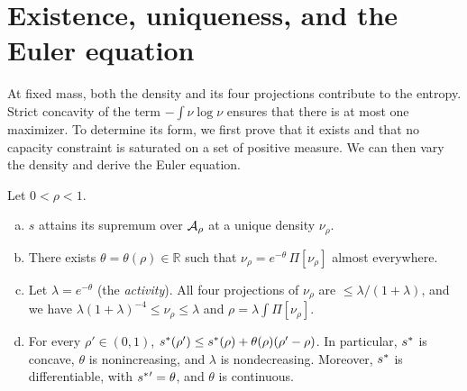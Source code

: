 \section{Existence, uniqueness, and the Euler equation}\label{sec:euler}

At fixed mass, both the density and its four projections contribute to the entropy. Strict concavity of the term $-\int\nu\log\nu$
ensures that there is at most one maximizer. To determine its form, we first prove that it exists and that no capacity constraint is
saturated on a set of positive measure. We can then vary the density and derive the Euler equation.

\begin{teorema}\label{thm:max} Let $0<\rho<1$. \begin{enumerate}[(a)] \item $s$ attains its supremum over ${\mathcal{A}}_\rho$ at a unique
density $\nu_\rho$. \item There exists $\theta=\theta(\rho)\in\mathbb R$ such that $\nu_\rho=e^{-\theta}\,\Pi[\nu_\rho]$ almost
everywhere. \item Let $\lambda=e^{-\theta}$ (the \emph{activity}). All four projections of $\nu_\rho$ are $\le\lambda/(1+\lambda)$, and
we have $\lambda(1+\lambda)^{-4}\le\nu_\rho\le\lambda$ and $\rho=\lambda\int\Pi[\nu_\rho]$. \item For every $\rho'\in(0,1)$,
$s^{*}(\rho')\le s^{*}(\rho)+\theta(\rho)(\rho'-\rho)$. In particular, $s^{*}$ is concave, $\theta$ is nonincreasing, and $\lambda$ is
nondecreasing. Moreover, $s^{*}$ is differentiable, with $s^{*}{}'=\theta$, and $\theta$ is continuous. \end{enumerate} \end{teorema}

